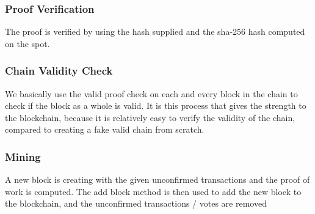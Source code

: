 \documentclass{article}
\begin{document}
\subsubsection{Proof Verification}
The proof is verified by using the hash supplied and the sha-256 hash computed on the spot.
\subsubsection{Chain Validity Check}
We basically use the valid proof check on each and every block in the chain to check if the block as a whole is valid. It is this process that gives the strength to the blockchain, because it is relatively easy to verify the validity of the chain, compared to creating a fake valid chain from scratch. 
\subsubsection{Mining}
A new block is creating with the given unconfirmed transactions and the proof of work is computed. The add block method is then used to add the new block to the blockchain, and the unconfirmed transactions / votes are removed
\end{document}
